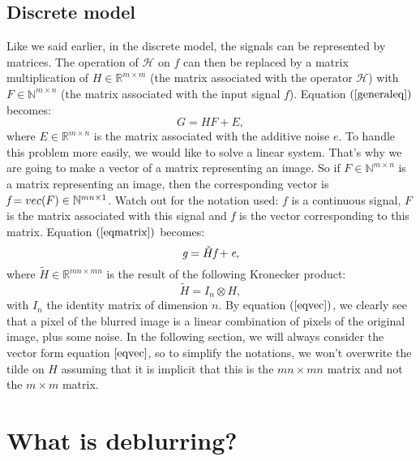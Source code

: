 \subsection{Discrete model}

Like we said earlier, in the discrete model, the signals can be represented by matrices. The operation of $\mathcal{H}$ on $f$ can then be replaced by a matrix multiplication of $H \in \mathbb{R}^{m \times m}$ (the matrix associated with the operator $\mathcal{H}$) with $F \in \mathbb{N}^{m \times n}$ (the matrix associated with the input signal $f$). Equation $(\ref{generaleq})$ becomes:
\begin{equation}
G = HF + E,
\label{eqmatrix}
\end{equation}
where $E \in \mathbb{R}^{m \times n}$ is the matrix associated with the additive noise $e$. To handle this problem more easily, we would like to solve a linear system. That's why we are going to make a vector of a matrix representing an image. So if $F \in \mathbb{N}^{m \times n}$ is a matrix representing an image, then the corresponding vector is $\emph{f} = vec(F) \in \mathbb{N}^{mn \times 1}$. Watch out for the notation used: $f$ is a continuous signal, $F$ is the matrix associated with this signal and $\emph{f}$  is the vector corresponding to this matrix. Equation $(\ref{eqmatrix})$ becomes:
\begin{equation}
\emph{g} = \tilde{H}\emph{f} + \emph{e},
\label{eqvec}
\end{equation}
where $\tilde{H} \in \mathbb{R}^{mn \times mn}$ is the result of the following Kronecker product:
\begin{equation}
\tilde{H} = I_n \otimes H,
\end{equation}
with $I_n$ the identity matrix of dimension $n$. By equation $(\ref{eqvec})$, we clearly see that a pixel of the blurred image is a linear combination of pixels of the original image, plus some noise. In the following section, we will always consider the vector form equation $\ref{eqvec}$, so to simplify the notations, we won't overwrite the tilde on $H$ assuming that it is implicit that this is the $mn \times mn$ matrix and not the $m \times m$ matrix.


\section{What is deblurring?} 


